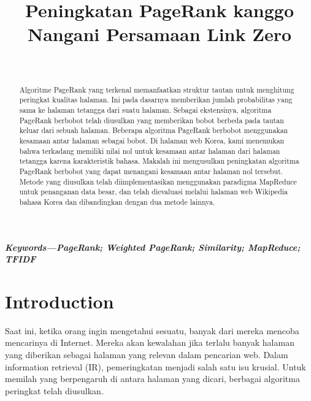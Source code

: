 \documentclass[conference]{IEEEtran}
\title{\textbf{Peningkatan PageRank kanggo Nangani Persamaan Link Zero}}
\author{\IEEEauthorblockN{Muhammad Rahmadi Husada}\\
\IEEEauthorblockA{Fakultas Teknologi Informasi\\
Institut Teknologi Batam\\
Batam, Kepulauan Riau, Indonesia\\
2022027@student.iteba.ac.id}}
\begin{document}
\maketitle

\begin{abstract}
    Algoritme PageRank yang terkenal memanfaatkan struktur tautan untuk menghitung peringkat kualitas halaman. Ini pada dasarnya memberikan jumlah probabilitas yang sama ke halaman tetangga dari suatu halaman. Sebagai ekstensinya, algoritma PageRank berbobot telah diusulkan yang memberikan bobot berbeda pada tautan keluar dari sebuah halaman. Beberapa algoritma PageRank berbobot menggunakan kesamaan antar halaman sebagai bobot. Di halaman web Korea, kami menemukan bahwa terkadang memiliki nilai nol untuk kesamaan antar halaman dari halaman tetangga karena karakteristik bahasa. Makalah ini mengusulkan peningkatan algoritma PageRank berbobot yang dapat menangani kesamaan antar halaman nol tersebut. Metode yang diusulkan telah diimplementasikan menggunakan paradigma MapReduce untuk penanganan data besar, dan telah dievaluasi melalui halaman web Wikipedia bahasa Korea dan dibandingkan dengan dua metode lainnya.

\end{abstract}\hspace{10pt}

\textbf{\textit{Keywords---PageRank; Weighted PageRank; Similarity; MapReduce; TFIDF}}
\section{Introduction}
Saat ini, ketika orang ingin mengetahui sesuatu, banyak dari mereka mencoba mencarinya di Internet. Mereka akan kewalahan jika terlalu banyak halaman yang diberikan sebagai halaman yang relevan dalam pencarian web. Dalam information retrieval (IR), pemeringkatan menjadi salah satu isu krusial. Untuk memilah yang berpengaruh di antara halaman yang dicari, berbagai algoritma peringkat telah diusulkan. \cite{brin1998anatomy,xing2004weighted,qiao2010simrank,page1999pagerank,kumar2013pagerank,duhan2009page,najork2007comparing,kumar2011page,nemirovsky2008weighted,tyagi2012weighted,haveliwala2003topic}
\end{document}
